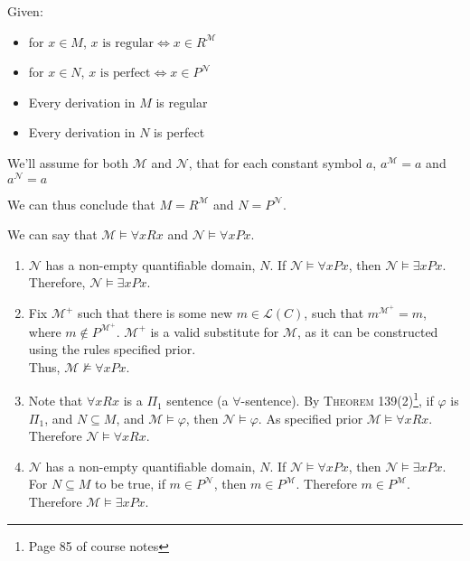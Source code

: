 \documentclass[a4paper]{article}
\newcommand{\MODEL}{\mathcal{M}}
\newcommand{\SUBMODEL}{\mathcal{N}}
\newcommand{\LANGUAGE}{\mathcal{L}}
\begin{document}
Given:

\begin{itemize}
    \item for $x \in M$, $x \text{ is regular} \Leftrightarrow x \in R^{\mathcal{M}}$
    \item for $x \in N$, $x \text{ is perfect} \Leftrightarrow x \in P^{\mathcal{N}}$
    \item Every derivation in $M$ is regular
    \item Every derivation in $N$ is perfect
\end{itemize}

We'll assume for both $\mathcal{M}$ and $\mathcal{N}$, that for each constant symbol $a$, $a^{\mathcal{M}} = a$ and $a^{\mathcal{N}} = a$

We can thus conclude that $M = R^\mathcal{M}$ and $N = P^\mathcal{N}$.


We can say that $\mathcal{M} \models \forall x Rx$ and $\mathcal{N} \models \forall x Px$.

\begin{enumerate}

    \item $\mathcal{N}$ has a non-empty quantifiable domain, $N$. If $\mathcal{N} \models \forall x Px$, then $\mathcal{N} \models \exists x Px$. Therefore, $\mathcal{N} \models \exists x Px$.

    \item Fix $\mathcal{M^{+}}$ such that there is some new $m \in $$\LANGUAGE(C)$, such that $m^\mathcal{M^{+}} = m$, where $m \not \in P^\mathcal{M^{+}}$. $\mathcal{M^{+}}$ is a valid substitute for $\MODEL$, as it can be constructed using the rules specified prior.\\

        Thus, $\MODEL \not \models \forall x P x$.

    \item Note that $\forall x Rx$ is a $\Pi_1$ sentence (a $\forall$-sentence). By \textsc{Theorem 139(2)}\footnote{Page 85 of course notes}, if $\varphi$ is $\Pi_1$, and $N \subseteq M$, and $\mathcal{M} \models \varphi$, then $\mathcal{N} \models \varphi$. As specified prior $\mathcal{M} \models \forall x Rx$. Therefore $\mathcal{N} \models \forall x Rx$.

    \item $\mathcal{N}$ has a non-empty quantifiable domain, $N$. If $\SUBMODEL \models \forall x Px$, then $\mathcal{N} \models \exists x Px$. For $N \subseteq M$ to be true, if $m \in P^{\SUBMODEL}$, then $m \in P^{\MODEL}$. Therefore $m \in P^{\MODEL}$. Therefore $\MODEL \models \exists x Px$. 

\end{enumerate}
\end{document}
